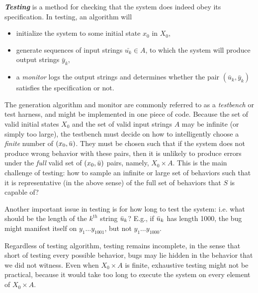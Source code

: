 \emph{\textbf{Testing}} is a method for checking that the system does indeed obey its specification. 
In testing, an algorithm will 
\begin{itemize}
	\item initialize the system to some initial state $x_0$ in $X_0$,
	\item generate sequences of input strings $\bar{u_k} \in A$, to which the system will produce output strings $\bar{y}_k$,
	\item a \emph{monitor} logs the output strings and determines whether the pair $(\bar{u}_k,\bar{y}_k)$ satisfies the specification or not.	
\end{itemize}

The generation algorithm and monitor are commonly referred to as a \emph{testbench} or test harness, and might be implemented in one piece of code. 
Because the set of valid initial states $X_0$ and the set of valid input strings $A$ may be infinite (or simply too large), the testbench must decide on how to intelligently choose a \emph{finite} number of $(x_0,\bar{u})$.
They must be chosen such that if the system does not produce wrong behavior with these pairs, then it is unlikely to produce errors under the \emph{full} valid set of $(x_0,\bar{u})$ pairs, namely, $X_0 \times A$.
This is the main challenge of testing: how to sample an infinite or large set of behaviors such that it is representative (in the above sense) of the full set of behaviors that $S$ is capable of?

Another important issue in testing is for how long to test the system: i.e. what should be the length of the $k^{th}$ string $\bar{u}_k$? 
E.g., if $\bar{u}_k$ has length 1000, the bug might manifest itself on $y_1\ldots y_{1001}$, but not $y_1\ldots y_{1000}$.

Regardless of testing algorithm, testing remains incomplete, in the sense that short of testing every possible behavior, bugs may lie hidden in the behavior that we did not witness.
Even when $X_0 \times A$ is finite, exhaustive testing might not be practical, because it would take too long to execute the system on every element of $X_0 \times A$.

